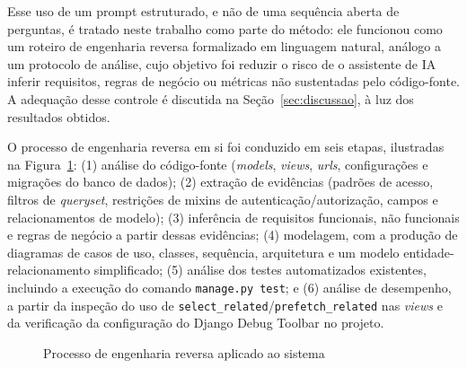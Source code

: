 \documentclass[12pt]{article}
\begin{document}
Esse uso de um prompt estruturado, e não de uma sequência aberta de
perguntas, é tratado neste trabalho como parte do método: ele funcionou como
um roteiro de engenharia reversa formalizado em linguagem natural, análogo a
um protocolo de análise, cujo objetivo foi reduzir o risco de o assistente
de IA inferir requisitos, regras de negócio ou métricas não sustentadas
pelo código-fonte. A adequação desse controle é discutida na
Seção~\ref{sec:discussao}, à luz dos resultados obtidos.

O processo de engenharia reversa em si foi conduzido em seis etapas, ilustradas na
Figura~\ref{fig:processo}: (1) análise do código-fonte (\emph{models},
\emph{views}, \emph{urls}, configurações e migrações do banco de dados); (2)
extração de evidências (padrões de acesso, filtros de \emph{queryset},
restrições de mixins de autenticação/autorização, campos e relacionamentos de
modelo); (3) inferência de requisitos funcionais, não funcionais e regras de
negócio a partir dessas evidências; (4) modelagem, com a produção de
diagramas de casos de uso, classes, sequência, arquitetura e um modelo
entidade-relacionamento simplificado; (5) análise dos testes automatizados
existentes, incluindo a execução do comando \texttt{manage.py test}; e (6)
análise de desempenho, a partir da inspeção do uso de
\texttt{select\_related}/\texttt{prefetch\_related} nas \emph{views} e da
verificação da configuração do Django Debug Toolbar no projeto.

\begin{figure}[ht]
\centering
{}
\caption{Processo de engenharia reversa aplicado ao sistema}
\label{fig:processo}
\end{figure}
\end{document}
